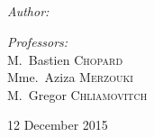 \begin{titlepage}
\begin{center}
\textsc{\Large \reportsubject}\\[1cm]
\HRule \\[1cm]
{\huge \bfseries \reporttitle}\\[0.5cm]
\HRule \\[2cm]

\begin{minipage}[t]{0.6\textwidth}
  \begin{flushleft} \large
    \emph{Author:}\\
    \reportauthor
  \end{flushleft}
\end{minipage}
\begin{minipage}[t]{0.39\textwidth}
  \begin{flushright} \large
    \emph{Professors:} \\
    M.~Bastien \textsc{ Chopard } \\ %
    Mme.~Aziza \textsc{Merzouki }\\
    M.~Gregor \textsc{Chliamovitch} %
  \end{flushright}
\end{minipage}

\vfill

{\large 12 December 2015}

\end{center}

\end{titlepage}
